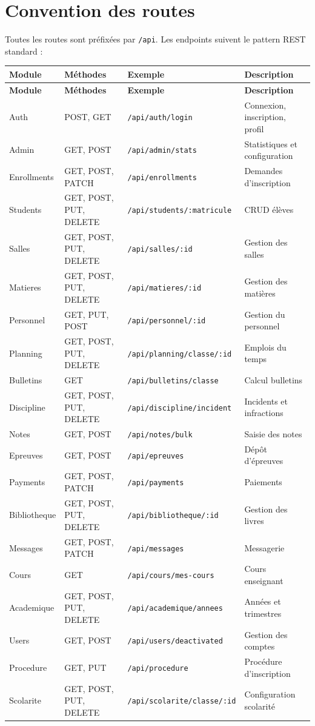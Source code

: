 \documentclass[12pt,a4paper]{report}
\begin{document}
\section{Convention des routes}
Toutes les routes sont préfixées par \texttt{/api}. Les endpoints suivent le pattern REST standard :

\begin{longtable}{|p{3cm}|p{2cm}|p{4cm}|p{6cm}|}
\hline
\textbf{Module} & \textbf{Méthodes} & \textbf{Exemple} & \textbf{Description} \\
\hline
\endfirsthead
\hline
\textbf{Module} & \textbf{Méthodes} & \textbf{Exemple} & \textbf{Description} \\
\hline
\endhead
Auth & POST, GET & \texttt{/api/auth/login} & Connexion, inscription, profil \\
\hline
Admin & GET, POST & \texttt{/api/admin/stats} & Statistiques et configuration \\
\hline
Enrollments & GET, POST, PATCH & \texttt{/api/enrollments} & Demandes d'inscription \\
\hline
Students & GET, POST, PUT, DELETE & \texttt{/api/students/:matricule} & CRUD élèves \\
\hline
Salles & GET, POST, PUT, DELETE & \texttt{/api/salles/:id} & Gestion des salles \\
\hline
Matieres & GET, POST, PUT, DELETE & \texttt{/api/matieres/:id} & Gestion des matières \\
\hline
Personnel & GET, PUT, POST & \texttt{/api/personnel/:id} & Gestion du personnel \\
\hline
Planning & GET, POST, PUT, DELETE & \texttt{/api/planning/classe/:id} & Emplois du temps \\
\hline
Bulletins & GET & \texttt{/api/bulletins/classe} & Calcul bulletins \\
\hline
Discipline & GET, POST, PUT, DELETE & \texttt{/api/discipline/incident} & Incidents et infractions \\
\hline
Notes & GET, POST & \texttt{/api/notes/bulk} & Saisie des notes \\
\hline
Epreuves & GET, POST & \texttt{/api/epreuves} & Dépôt d'épreuves \\
\hline
Payments & GET, POST, PATCH & \texttt{/api/payments} & Paiements \\
\hline
Bibliotheque & GET, POST, PUT, DELETE & \texttt{/api/bibliotheque/:id} & Gestion des livres \\
\hline
Messages & GET, POST, PATCH & \texttt{/api/messages} & Messagerie \\
\hline
Cours & GET & \texttt{/api/cours/mes-cours} & Cours enseignant \\
\hline
Academique & GET, POST, PUT, DELETE & \texttt{/api/academique/annees} & Années et trimestres \\
\hline
Users & GET, POST & \texttt{/api/users/deactivated} & Gestion des comptes \\
\hline
Procedure & GET, PUT & \texttt{/api/procedure} & Procédure d'inscription \\
\hline
Scolarite & GET, POST, PUT, DELETE & \texttt{/api/scolarite/classe/:id} & Configuration scolarité \\
\hline
\end{longtable}
\end{document}
